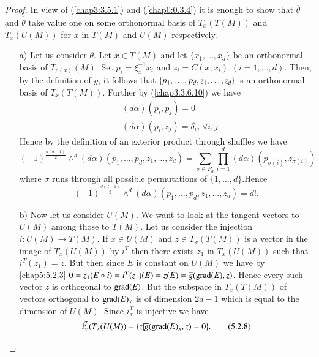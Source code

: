 \begin{proof}
In view of (\ref{chap3:3.5.1}) and (\ref{chap0:0.3.4}) it is enough to show
that $\overline{\theta}$ and $\overline{\overline{\theta}}$ take value
one on some orthonormal basis of $T_{x}(T(M))$ and $T_{x}(U(M))$ for
$x$ in $T(M)$ and $U(M)$ respectively.
\begin{itemize}
\item[a)] Let us consider $\overline{\theta}$. Let $x\in T(M)$ and let
  $\{x_{1},\ldots,x_{d}\}$ be an orthonormal basis of
  $T_{p(x)}(M)$. Set $p_{i}=\xi^{-1}_{x}x_{i}$ and $z_{i}=C(x,x_{i})$
  $(i=1,\ldots,d)$. Then, by the definition of $\overline{g}$, it
  follows that $\{p_{1},\ldots,p_{d},\unskip\break z_{1},\ldots,z_{d}\}$ is an
  orthonormal basis of $T_{x}(T(M))$. Further by (\ref{chap3:3.6.10}) we
  have
\begin{align*}
& (d\alpha)(p_{i},p_{j})=0\\
& (d\alpha)(p_{i},z_{j})=\delta_{ij} \; \forall i,j\tag{5.2.7}\label{chap5:5.2.7}
\end{align*}\pageoriginale
Hence by the definition of an exterior product through shuffles we have
$$
(-1)^{\frac{d(d-1)}{2}}\mathop{\wedge}^{d}(d\alpha)(p_{1},\ldots,p_{d},z_{1},\ldots,z_{d})=\sum_{\sigma\in P_{d}}\prod^{d}_{i=1}(d\alpha)(p_{\sigma(i)},z_{\sigma(i)})
$$
where $\sigma$ runs through all possible permutations of
$\{1,\ldots,d\}$.\break Hence
$$
(-1)^{\frac{d(d-1)}{2}}\mathop{\wedge}^{d}(d\alpha)(p_{1},\ldots,p_{d},z_{1},\ldots,z_{d})=d!.  
$$

\item[b)] Now let us consider $U(M)$. We want to look at the tangent
  vectors to $U(M)$ among those to $T(M)$. Let us consider the
  injection $i:U(M)\to T(M)$. If $x\in U(M)$ and $z\in T_{x}(T(M))$ is
  a vector in the image of $T_{x}(U(M))$ by $i^{T}$ then there exists
  $z_{1}$ in $T_{x}(U(M))$ such that $i^{T}(z_{1})=z$. But then since
  $E$ is constant on $U(M)$ we have by \eqref{chap5:5.2.3} $0=z_{1}(E\circ
  i)=i^{T}(z_{1})(E)=z(E)=\overline{g}(\operatorname{grad}(E),z)$. Hence every such
  vector $z$ is orthogonal to $\operatorname{grad}(E)$. But the subspace in
  $T_{x}(T(M))$ of vectors orthogonal to $\operatorname{grad}(E)_{x}$ is of
  dimension $2d-1$ which is equal to the dimension of $U(M)$. Since
  $i^{T}_{x}$ is injective we have
\begin{equation*}
i^{T}_{x}(T_{x}(U(M))=\{z|\overline{g}(\operatorname{grad}(E)_{x},z)=0\}.\tag{5.2.8}\label{chap5:5.2.8} 
\end{equation*}
\end{itemize}
\end{proof}

